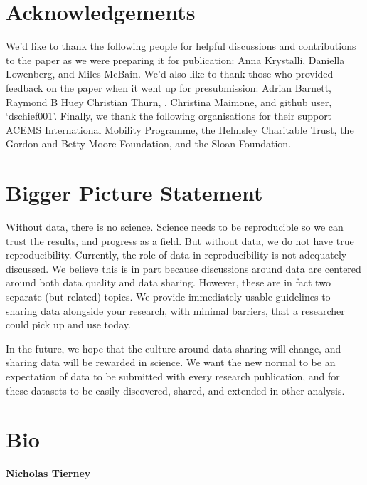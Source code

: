 \documentclass[
]{article}
\begin{document}
\hypertarget{acknowledgements}{%
\section{Acknowledgements}\label{acknowledgements}}

We'd like to thank the following people for helpful discussions and contributions to the paper as we were preparing it for publication: Anna Krystalli, Daniella Lowenberg, and Miles McBain. We'd also like to thank those who provided feedback on the paper when it went up for presubmission: Adrian Barnett, Raymond B Huey Christian Thurn, , Christina Maimone, and github user, `dschief001'. Finally, we thank the following organisations for their support ACEMS International Mobility Programme, the Helmsley Charitable Trust, the Gordon and Betty Moore Foundation, and the Sloan Foundation.

\hypertarget{bigger-picture-statement}{%
\section*{Bigger Picture Statement}\label{bigger-picture-statement}}

Without data, there is no science. Science needs to be reproducible so we can trust the results, and progress as a field. But without data, we do not have true reproducibility. Currently, the role of data in reproducibility is not adequately discussed. We believe this is in part because discussions around data are centered around both data quality and data sharing. However, these are in fact two separate (but related) topics. We provide immediately usable guidelines to sharing data alongside your research, with minimal barriers, that a researcher could pick up and use today.

In the future, we hope that the culture around data sharing will change, and sharing data will be rewarded in science. We want the new normal to be an expectation of data to be submitted with every research publication, and for these datasets to be easily discovered, shared, and extended in other analysis.

\hypertarget{bio}{%
\section*{Bio}\label{bio}}

\textbf{Nicholas Tierney}
\end{document}
